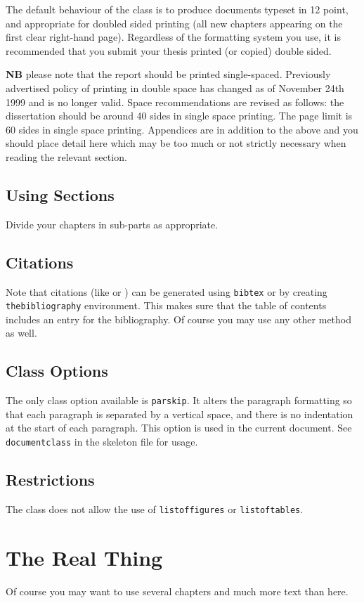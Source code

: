 \documentclass[parskip]{cs4rep}
\begin{document}
The default behaviour of the class is to produce documents typeset in
12 point, 
and appropriate for doubled sided printing
(all new chapters appearing on the first clear right-hand page).
Regardless of the formatting system you use, 
it is recommended that you submit your thesis printed (or copied) 
double sided. 

{\bf NB} please note that the report should be printed single-spaced.
Previously advertised policy of printing in double space has changed
as of November 24th 1999 and is no longer valid.
Space recommendations are revised as follows: 
the dissertation should be around 40 sides in single space printing.
The page limit is 60 sides in single space printing.  Appendices are in
addition to the above and you should place detail here which may be too
much or not strictly necessary when reading the relevant section.

\section{Using Sections}

Divide your chapters in sub-parts as appropriate.

\section{Citations}

Note that citations 
(like \cite{P1} or \cite{P2})
can be generated using {\tt bibtex} or by
creating {\tt thebibliography} environment. This makes sure that the
table of contents includes an entry for the bibliography.
Of course you may use any other method as well.

\section{Class Options}

The only class option available is {\tt parskip}.
It alters the paragraph formatting so that each paragraph is separated by
a vertical space, and there is no indentation at the start of each
paragraph. 
This option is used in the current document.
See {\tt documentclass} in the skeleton file for usage. 

\section{Restrictions}

The class does not allow the use of {\tt listoffigures} or {\tt listoftables}.

\chapter{The Real Thing}

Of course
you may want to use several chapters and much more text than here.



\end{document}
